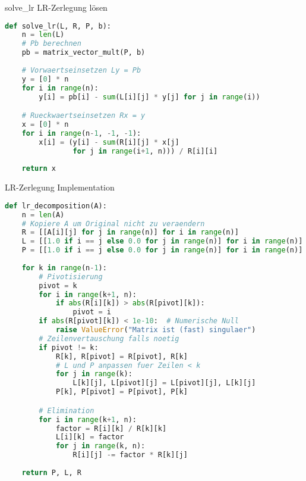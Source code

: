 \begin{examplecode}{solve\_lr} LR-Zerlegung lösen
\begin{lstlisting}[language=Python, style=basesmol]
def solve_lr(L, R, P, b):
    n = len(L)
    # Pb berechnen
    pb = matrix_vector_mult(P, b)
    
    # Vorwaertseinsetzen Ly = Pb
    y = [0] * n
    for i in range(n):
        y[i] = pb[i] - sum(L[i][j] * y[j] for j in range(i))

    # Rueckwaertseinsetzen Rx = y
    x = [0] * n
    for i in range(n-1, -1, -1):
        x[i] = (y[i] - sum(R[i][j] * x[j] 
                for j in range(i+1, n))) / R[i][i]
                
    return x
\end{lstlisting}
\end{examplecode}

\begin{examplecode}{LR-Zerlegung Implementation}
\begin{lstlisting}[language=Python, style=basesmol]
def lr_decomposition(A):
    n = len(A)
    # Kopiere A um Original nicht zu veraendern
    R = [[A[i][j] for j in range(n)] for i in range(n)]
    L = [[1.0 if i == j else 0.0 for j in range(n)] for i in range(n)]
    P = [[1.0 if i == j else 0.0 for j in range(n)] for i in range(n)]
    
    for k in range(n-1):
        # Pivotisierung
        pivot = k
        for i in range(k+1, n):
            if abs(R[i][k]) > abs(R[pivot][k]):
                pivot = i
        if abs(R[pivot][k]) < 1e-10:  # Numerische Null
            raise ValueError("Matrix ist (fast) singulaer")
        # Zeilenvertauschung falls noetig
        if pivot != k:
            R[k], R[pivot] = R[pivot], R[k]
            # L und P anpassen fuer Zeilen < k
            for j in range(k):
                L[k][j], L[pivot][j] = L[pivot][j], L[k][j]
            P[k], P[pivot] = P[pivot], P[k]

        # Elimination
        for i in range(k+1, n):
            factor = R[i][k] / R[k][k]
            L[i][k] = factor
            for j in range(k, n):
                R[i][j] -= factor * R[k][j]
               
    return P, L, R
\end{lstlisting}
\end{examplecode}

